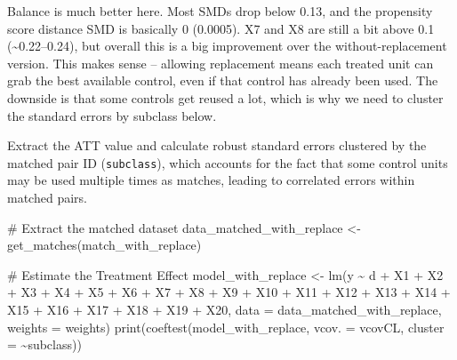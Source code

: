 \documentclass[
  letterpaper,
  DIV=11,
  numbers=noendperiod]{scrartcl}
\newenvironment{Shaded}{\begin{snugshade}}{\end{snugshade}}
\newcommand{\AttributeTok}[1]{\textcolor[rgb]{0.40,0.45,0.13}{#1}}
\newcommand{\CommentTok}[1]{\textcolor[rgb]{0.37,0.37,0.37}{#1}}
\newcommand{\FunctionTok}[1]{\textcolor[rgb]{0.28,0.35,0.67}{#1}}
\newcommand{\NormalTok}[1]{\textcolor[rgb]{0.00,0.23,0.31}{#1}}
\newcommand{\OtherTok}[1]{\textcolor[rgb]{0.00,0.23,0.31}{#1}}
\newcommand{\SpecialCharTok}[1]{\textcolor[rgb]{0.37,0.37,0.37}{#1}}
\begin{document}
Balance is much better here. Most SMDs drop below 0.13, and the
propensity score distance SMD is basically 0 (0.0005). X7 and X8 are
still a bit above 0.1 (\textasciitilde0.22--0.24), but overall this is a
big improvement over the without-replacement version. This makes sense
-- allowing replacement means each treated unit can grab the best
available control, even if that control has already been used. The
downside is that some controls get reused a lot, which is why we need to
cluster the standard errors by subclass below.

Extract the ATT value and calculate robust standard errors clustered by
the matched pair ID (\texttt{subclass}), which accounts for the fact
that some control units may be used multiple times as matches, leading
to correlated errors within matched pairs.

\begin{Shaded}
\begin{Highlighting}[]
\CommentTok{\# Extract the matched dataset}
\NormalTok{data\_matched\_with\_replace }\OtherTok{\textless{}{-}} \FunctionTok{get\_matches}\NormalTok{(match\_with\_replace)}

\CommentTok{\# Estimate the Treatment Effect}
\NormalTok{model\_with\_replace }\OtherTok{\textless{}{-}} \FunctionTok{lm}\NormalTok{(y }\SpecialCharTok{\textasciitilde{}}\NormalTok{ d }\SpecialCharTok{+}\NormalTok{ X1 }\SpecialCharTok{+}\NormalTok{ X2 }\SpecialCharTok{+}\NormalTok{ X3 }\SpecialCharTok{+}\NormalTok{ X4 }\SpecialCharTok{+}\NormalTok{ X5 }\SpecialCharTok{+}\NormalTok{ X6 }\SpecialCharTok{+}\NormalTok{ X7 }\SpecialCharTok{+}\NormalTok{ X8 }\SpecialCharTok{+}\NormalTok{ X9 }\SpecialCharTok{+} 
\NormalTok{                         X10 }\SpecialCharTok{+}\NormalTok{ X11 }\SpecialCharTok{+}\NormalTok{ X12 }\SpecialCharTok{+}\NormalTok{ X13 }\SpecialCharTok{+}\NormalTok{ X14 }\SpecialCharTok{+}\NormalTok{ X15 }\SpecialCharTok{+}\NormalTok{ X16 }\SpecialCharTok{+}\NormalTok{ X17 }\SpecialCharTok{+}\NormalTok{ X18 }\SpecialCharTok{+}
\NormalTok{                         X19 }\SpecialCharTok{+}\NormalTok{ X20, }
                         \AttributeTok{data =}\NormalTok{ data\_matched\_with\_replace, }
                         \AttributeTok{weights =}\NormalTok{ weights)}
\FunctionTok{print}\NormalTok{(}\FunctionTok{coeftest}\NormalTok{(model\_with\_replace, }\AttributeTok{vcov. =}\NormalTok{ vcovCL, }\AttributeTok{cluster =} \SpecialCharTok{\textasciitilde{}}\NormalTok{subclass))}
\end{Highlighting}
\end{Shaded}
\end{document}
